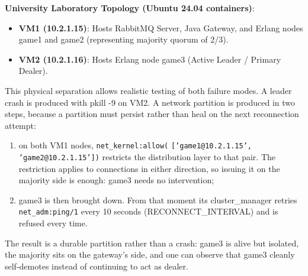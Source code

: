\documentclass[12pt,a4paper]{article}
\begin{document}
\textbf{University Laboratory Topology (Ubuntu 24.04 containers)}:
\begin{itemize}
    \item \textbf{VM1 (10.2.1.15)}: Hosts RabbitMQ Server, Java Gateway, and Erlang nodes game1 and game2 (representing majority quorum of 2/3).
    \item \textbf{VM2 (10.2.1.16)}: Hosts Erlang node game3 (Active Leader / Primary Dealer).
\end{itemize}

This physical separation allows realistic testing of both failure modes. A leader crash is produced with pkill -9 on VM2. A network partition is produced in two steps, because a partition must persist rather than heal on the next reconnection attempt:
\begin{enumerate}
    \item on both VM1 nodes, \texttt{net\_\allowbreak kernel:allow(} \allowbreak \texttt{['game1@10.2.1.15',} \allowbreak \texttt{'game2@10.2.1.15'])} restricts the distribution layer to that pair. The restriction applies to connections in either direction, so issuing it on the majority side is enough: game3 needs no intervention;
    \item game3 is then brought down. From that moment its cluster\_\allowbreak manager retries \texttt{net\_\allowbreak adm:ping/1} every 10 seconds (RECONNECT\_\allowbreak INTERVAL) and is refused every time.
\end{enumerate}
The result is a durable partition rather than a crash: game3 is alive but isolated, the majority sits on the gateway's side, and one can observe that game3 cleanly self-demotes instead of continuing to act as dealer.
\end{document}
